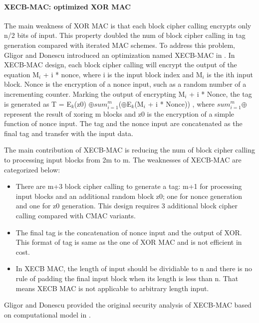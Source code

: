 \documentclass{article}
\begin{document}
\paragraph{XECB-MAC: optimized XOR MAC}
The main weakness of XOR MAC is that each block cipher calling encrypts only n/2 bits of input. This property doubled the num of block cipher calling in tag generation compared with iterated MAC schemes. To address this problem, Gligor and Donescu introduced an optimization named XECB-MAC in \cite{}. In XECB-MAC design, each block cipher calling will encrypt the output of the equation M$_i$ + i * nonce, where i is the input block index and M$_i$ is the ith input block. Nonce is the encryption of a nonce input, such as a random number of a incrementing counter. Marking the output of encrypting M$_i$ + i * Nonce, the tag is generated as T = E$_k$(z0) $\oplus$$sum_{i=1}^{m}$($\oplus$E$_k$(M$_i$ + i * Nonce)) , where $sum_{i=1}^{m}$$\oplus$ represent the result of xoring m blocks and z0 is the encryption of a simple function of nonce input. The tag and the nonce input are concatenated as the final tag and transfer with the input data. 

The main contribution of XECB-MAC is reducing the num of block cipher calling to processing input blocks from 2m to m.
The weaknesses of XECB-MAC are categorized below:
\begin{itemize}
	\item There are m+3 block cipher calling to generate a tag: m+1 for processing input blocks and an additional random block z0; one for nonce generation and one for z0 generation. This design requires 3 additional block cipher calling compared with CMAC variants.
	\item The final tag is the concatenation of nonce input and the output of XOR. This format of tag is same as the one of XOR MAC and is not efficient in cost.
	\item In XECB MAC, the length of input should be dividiable to n and there is no rule of padding the final input block when its length is less than n. That means XECB MAC is not applicable to arbitrary length input. 
\end{itemize}

Gligor and Donescu provided the original security analysis of XECB-MAC based on computational model in \cite{}. 
\end{document}
